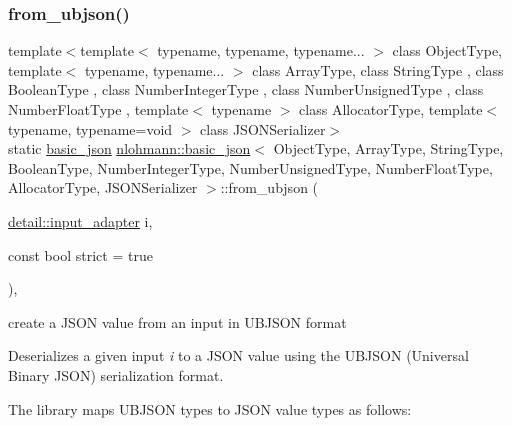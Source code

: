 \subsubsection{\texorpdfstring{from\+\_\+ubjson()}{from\_ubjson()}\hspace{0.1cm}{\footnotesize\ttfamily [1/2]}}
{\footnotesize\ttfamily template$<$template$<$ typename, typename, typename... $>$ class Object\+Type, template$<$ typename, typename... $>$ class Array\+Type, class String\+Type , class Boolean\+Type , class Number\+Integer\+Type , class Number\+Unsigned\+Type , class Number\+Float\+Type , template$<$ typename $>$ class Allocator\+Type, template$<$ typename, typename=void $>$ class J\+S\+O\+N\+Serializer$>$ \\
static \hyperlink{classnlohmann_1_1basic__json}{basic\+\_\+json} \hyperlink{classnlohmann_1_1basic__json}{nlohmann\+::basic\+\_\+json}$<$ Object\+Type, Array\+Type, String\+Type, Boolean\+Type, Number\+Integer\+Type, Number\+Unsigned\+Type, Number\+Float\+Type, Allocator\+Type, J\+S\+O\+N\+Serializer $>$\+::from\+\_\+ubjson (\begin{DoxyParamCaption}\item[{\hyperlink{classnlohmann_1_1detail_1_1input__adapter}{detail\+::input\+\_\+adapter}}]{i,  }\item[{const bool}]{strict = {\ttfamily true} }\end{DoxyParamCaption})\hspace{0.3cm}{\ttfamily [inline]}, {\ttfamily [static]}}



create a J\+S\+ON value from an input in U\+B\+J\+S\+ON format 

Deserializes a given input {\itshape i} to a J\+S\+ON value using the U\+B\+J\+S\+ON (Universal Binary J\+S\+ON) serialization format.

The library maps U\+B\+J\+S\+ON types to J\+S\+ON value types as follows\+:

